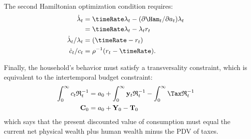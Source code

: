 \documentclass{handout}\usepackage{handoutSetup}\usepackage{handoutShortcuts}
\begin{document}
The second Hamiltonian optimization condition requires:
\begin{equation}\begin{gathered}\begin{aligned}
        \dot{\lambda}_{t} & =  \timeRate\lambda_{t} - (\partial \Ham_{t}/\partial a_{t})\lambda_{t}  \\
         & =  \timeRate\lambda_{t} - \lambda_{t} r_{t}
\\      \dot{\lambda}_{t}/{\lambda_{t}} & =  (\timeRate-r_{t})
\\  \dot{c}_{t}/c_{t}  & =  \rho^{-1}(r_{t}-\timeRate).
\end{aligned}\end{gathered}\end{equation}

Finally, the household's behavior must satisfy a transversality 
constraint, which is equivalent to the intertemporal budget constraint:
\begin{equation}\begin{gathered}\begin{aligned}
        \int_{0}^{\infty} c_{t}\mathfrak{R}^{-1}_{t} & =  a_{0}+\int_{0}^{\infty} \mathbf{y}_{t} \mathfrak{R}^{-1}_{t}-\int_{0}^{\infty} \Tax \mathfrak{R}^{-1}_{t}
\\  \mathbf{C}_{0} & =        a_{0}+\mathbf{Y}_{0}-\mathbf{T}_{0}
\end{aligned}\end{gathered}\end{equation}
which says that the present discounted value of consumption must equal 
the current net physical wealth plus human wealth minus the PDV of 
taxes.
\end{document}

